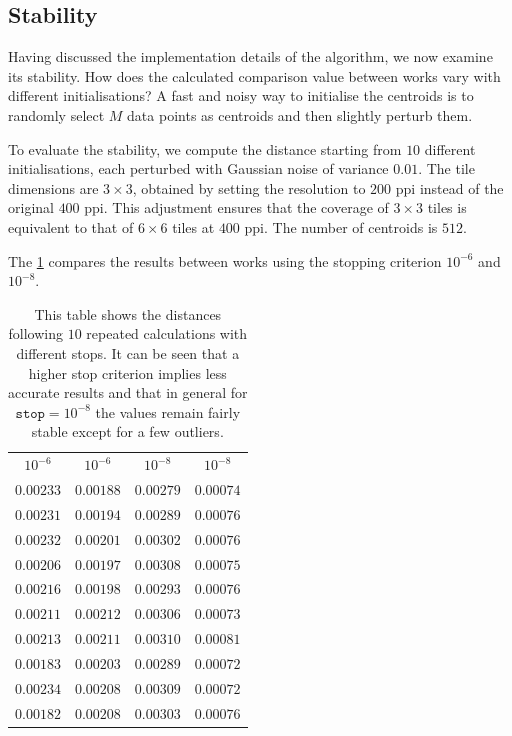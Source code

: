 \begin{toReview}
	\subsection{Stability} Having discussed the implementation details of the algorithm, we now examine its stability. How does the calculated comparison value between works vary with different initialisations? A fast and noisy way to initialise the centroids is to randomly select $M$ data points as centroids and then slightly perturb them.

	\noindent To evaluate the stability, we compute the distance starting from $10$ different initialisations, each perturbed with Gaussian noise of variance $0.01$. The tile dimensions are $3\times3$, obtained by setting the resolution to $200$ \gls{ppi} instead of the original $400$ \gls{ppi}. This adjustment ensures that the coverage of $3\times3$ tiles is equivalent to that of $6\times6$ tiles at $400$ \gls{ppi}. The number of centroids is $512$.

	\noindent The \cref{tab:distStability} compares the results between works using the stopping criterion $10^{-6}$ and $10^{-8}$.

	\begin{table}[H]
		\centering
		\begin{tabular}{|c|c|c|c|}
			\hline
			\rowcolor{ambra}
			\multicolumn{4}{|c|}{stop criteria} \\
			\hline
			\rowcolor{lavender}
			$10^{-6}$ & $10^{-6}$ & $10^{-8}$ & $10^{-8}$ \\
			\hline
			$0.00233$ & $0.00188$ & $0.00279$ & $0.00074$ \\
			\hline
			$0.00231$ & $0.00194$ & $0.00289$ & $0.00076$ \\
			\hline
			$0.00232$ & $0.00201$ & $0.00302$ & $0.00076$ \\
			\hline
			$0.00206$ & $0.00197$ & $0.00308$ & $0.00075$ \\
			\hline
			$0.00216$ & $0.00198$ & $0.00293$ & $0.00076$ \\
			\hline
			$0.00211$ & $0.00212$ & $0.00306$ & $0.00073$ \\
			\hline
			$0.00213$ & $0.00211$ & $0.00310$ & $0.00081$ \\
			\hline
			$0.00183$ & $0.00203$ & $0.00289$ & $0.00072$ \\
			\hline
			$0.00234$ & $0.00208$ & $0.00309$ & $0.00072$ \\
			\hline
			$0.00182$ & $0.00208$ & $0.00303$ & $0.00076$ \\
			\hline
		\end{tabular}
		\caption[Stability of comparison algorithm for $3\times3$ tiles]{This table shows the distances following $10$ repeated calculations with different stops. It can be seen that a higher stop criterion implies less accurate results and that in general for $\texttt{stop}=10^{-8}$ the values remain fairly stable except for a few outliers.}
		\label{tab:distStability}
	\end{table}


\end{toReview}
